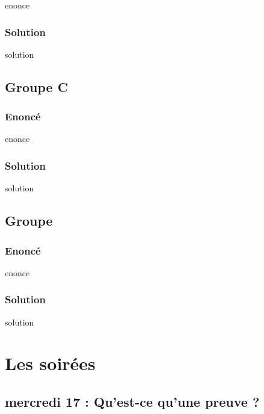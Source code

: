 \documentclass[12pt,A4]{book}
\theoremstyle{definition}
\theoremstyle{thm}
\theoremstyle{def}
\newcounter{sol}[subsection]
\begin{document}
{enonce}

\subsection{Solution}

{solution}



\section{Groupe C}

\subsection{Enoncé}

{enonce}

\subsection{Solution}

{solution}



\section{Groupe }

\subsection{Enoncé}

{enonce}

\subsection{Solution}

{solution}







\chapter{Les soirées}
\minitoc \bigskip


\section{mercredi 17 : Qu'est-ce qu'une preuve ?}
\end{document}
